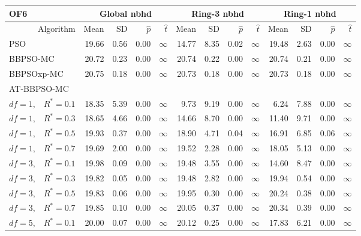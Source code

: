 \documentclass[cmbright]{staauth}
\begin{document}
\begin{table}[ht]
\centering
\tiny{
\begin{tabular}{r|rrrr|rrrr|rrrr}
\multicolumn{1}{l}{OF6} & \multicolumn{4}{c}{Global nbhd} & \multicolumn{4}{c}{Ring-3 nbhd} & \multicolumn{4}{c}{Ring-1 nbhd}\\
  \hline
Algorithm & Mean & SD & $\widehat{p}$ & $\widehat{t}$ & Mean & SD & $\widehat{p}$ & $\widehat{t}$ & Mean & SD & $\widehat{p}$ & $\widehat{t}$ \\
  \hline
\multicolumn{1}{l|}{PSO} & 19.66 & 0.56 & 0.00 & $\infty$ & 14.77 & 8.35 & 0.02 & $\infty$ & 19.48 & 2.63 & 0.00 & $\infty$ \\
  \multicolumn{1}{l|}{BBPSO-MC} & 20.72 & 0.23 & 0.00 & $\infty$ & 20.74 & 0.22 & 0.00 & $\infty$ & 20.74 & 0.21 & 0.00 & $\infty$ \\
  \multicolumn{1}{l|}{BBPSOxp-MC} & 20.75 & 0.18 & 0.00 & $\infty$ & 20.73 & 0.18 & 0.00 & $\infty$ & 20.73 & 0.18 & 0.00 & $\infty$ \\
\hline
\multicolumn{1}{l|}{AT-BBPSO-MC} &&&&&&&&&&&&\\
  $df = 1,\enspace$ $R^* =0.1$ & 18.35 & 5.39 & 0.00 & $\infty$ & 9.73 & 9.19 & 0.00 & $\infty$ & 6.24 & 7.88 & 0.00 & $\infty$ \\
  $df = 1,\enspace$ $R^* =0.3$ & 18.65 & 4.66 & 0.00 & $\infty$ & 14.66 & 8.70 & 0.00 & $\infty$ & 11.40 & 9.71 & 0.00 & $\infty$ \\
  $df = 1,\enspace$ $R^* =0.5$ & 19.93 & 0.37 & 0.00 & $\infty$ & 18.90 & 4.71 & 0.04 & $\infty$ & 16.91 & 6.85 & 0.06 & $\infty$ \\
  $df = 1,\enspace$ $R^* =0.7$ & 19.69 & 2.00 & 0.00 & $\infty$ & 19.52 & 2.28 & 0.00 & $\infty$ & 18.05 & 5.13 & 0.00 & $\infty$ \\
  $df = 3,\enspace$ $R^* =0.1$ & 19.98 & 0.09 & 0.00 & $\infty$ & 19.48 & 3.55 & 0.00 & $\infty$ & 14.60 & 8.47 & 0.00 & $\infty$ \\
  $df = 3,\enspace$ $R^* =0.3$ & 19.82 & 0.05 & 0.00 & $\infty$ & 19.48 & 2.82 & 0.00 & $\infty$ & 19.94 & 0.54 & 0.00 & $\infty$ \\
  $df = 3,\enspace$ $R^* =0.5$ & 19.83 & 0.06 & 0.00 & $\infty$ & 19.95 & 0.30 & 0.00 & $\infty$ & 20.24 & 0.38 & 0.00 & $\infty$ \\
  $df = 3,\enspace$ $R^* =0.7$ & 19.85 & 0.10 & 0.00 & $\infty$ & 20.05 & 0.37 & 0.00 & $\infty$ & 20.34 & 0.39 & 0.00 & $\infty$ \\
  $df = 5,\enspace$ $R^* =0.1$ & 20.00 & 0.07 & 0.00 & $\infty$ & 20.12 & 0.25 & 0.00 & $\infty$ & 17.83 & 6.21 & 0.00 & $\infty$ \\

\end{tabular}}
\end{table}
\end{document}
